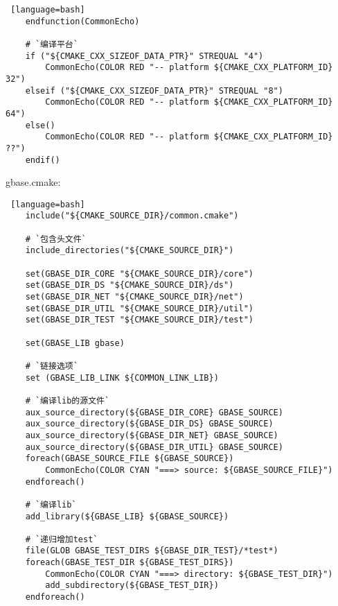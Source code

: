 {\begin{lstlisting} [language=bash]
    endfunction(CommonEcho)

    # `编译平台`
    if ("${CMAKE_CXX_SIZEOF_DATA_PTR}" STREQUAL "4")
        CommonEcho(COLOR RED "-- platform ${CMAKE_CXX_PLATFORM_ID} 32")
    elseif ("${CMAKE_CXX_SIZEOF_DATA_PTR}" STREQUAL "8")
        CommonEcho(COLOR RED "-- platform ${CMAKE_CXX_PLATFORM_ID} 64")
    else()
        CommonEcho(COLOR RED "-- platform ${CMAKE_CXX_PLATFORM_ID} ??")
    endif()
\end{lstlisting}

{gbase.cmake: }\par
\begin{lstlisting} [language=bash]
    include("${CMAKE_SOURCE_DIR}/common.cmake")

    # `包含头文件`
    include_directories("${CMAKE_SOURCE_DIR}")

    set(GBASE_DIR_CORE "${CMAKE_SOURCE_DIR}/core")
    set(GBASE_DIR_DS "${CMAKE_SOURCE_DIR}/ds")
    set(GBASE_DIR_NET "${CMAKE_SOURCE_DIR}/net")
    set(GBASE_DIR_UTIL "${CMAKE_SOURCE_DIR}/util")
    set(GBASE_DIR_TEST "${CMAKE_SOURCE_DIR}/test")

    set(GBASE_LIB gbase)

    # `链接选项`
    set (GBASE_LIB_LINK ${COMMON_LINK_LIB})

    # `编译lib的源文件`
    aux_source_directory(${GBASE_DIR_CORE} GBASE_SOURCE)
    aux_source_directory(${GBASE_DIR_DS} GBASE_SOURCE)
    aux_source_directory(${GBASE_DIR_NET} GBASE_SOURCE)
    aux_source_directory(${GBASE_DIR_UTIL} GBASE_SOURCE)
    foreach(GBASE_SOURCE_FILE ${GBASE_SOURCE})
        CommonEcho(COLOR CYAN "===> source: ${GBASE_SOURCE_FILE}")
    endforeach()

    # `编译lib`
    add_library(${GBASE_LIB} ${GBASE_SOURCE})

    # `递归增加test`
    file(GLOB GBASE_TEST_DIRS ${GBASE_DIR_TEST}/*test*)
    foreach(GBASE_TEST_DIR ${GBASE_TEST_DIRS})
        CommonEcho(COLOR CYAN "===> directory: ${GBASE_TEST_DIR}")
        add_subdirectory(${GBASE_TEST_DIR})
    endforeach()
\end{lstlisting}
}



